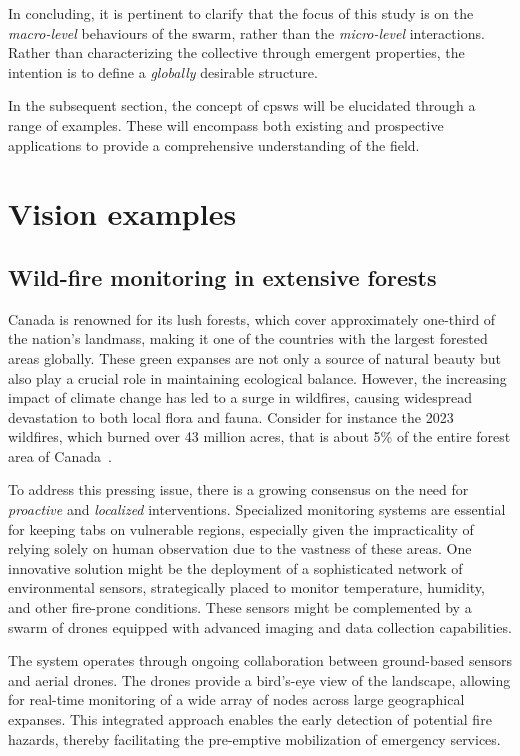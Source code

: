 In concluding, 
 it is pertinent to clarify that the focus of this study is on the \textit{macro-level} behaviours of the swarm, 
 rather than the \textit{micro-level} interactions. 
 Rather than characterizing the collective through emergent properties, 
 the intention is to define a \emph{globally} desirable structure.

In the subsequent section, 
 the concept of \acp{cpsw} will be elucidated through a range of examples. 
 These will encompass both existing and prospective applications to provide a comprehensive understanding of the field.
\section{Vision examples}\label{chap:cpsw:vision}
\subsection{Wild-fire monitoring in extensive forests}
Canada is renowned for its lush forests, 
 which cover approximately one-third of the nation's landmass, 
 making it one of the countries with the largest forested areas globally. 
These green expanses are not only a source of natural beauty but also play a crucial role in maintaining ecological balance. 
 However, the increasing impact of climate change has led to a surge in wildfires, 
 causing widespread devastation to both local flora and fauna.
 Consider for instance the 2023 wildfires, 
 which burned over 43 million acres, 
 that is about 5\% of the entire forest area of Canada~\cite{enwiki:1178342069}. 

To address this pressing issue, 
 there is a growing consensus on the need for \emph{proactive} and \emph{localized} interventions. 
 Specialized monitoring systems are essential for keeping tabs on vulnerable regions, 
 especially given the impracticality of relying solely on human observation due to the vastness of these areas. 
 One innovative solution might be the deployment of a sophisticated network of environmental sensors, 
 strategically placed to monitor temperature, humidity, and other fire-prone conditions. 
 These sensors might be complemented by a swarm of drones equipped with advanced imaging and data collection capabilities.

The system operates through ongoing collaboration between ground-based sensors and aerial drones. 
 The drones provide a bird's-eye view of the landscape, 
 allowing for real-time monitoring of a wide array of nodes across large geographical expanses. 
 This integrated approach enables the early detection of potential fire hazards, 
 thereby facilitating the pre-emptive mobilization of emergency services.

